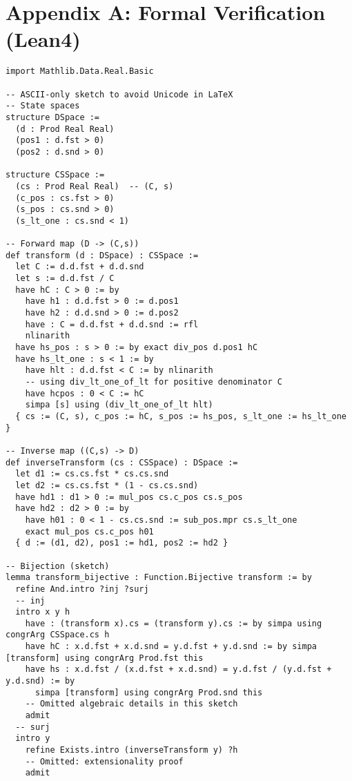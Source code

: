 ﻿\documentclass[11pt,letterpaper,oneside]{article}
\numberwithin{equation}{section}
\newcommand{\1}{\mathbf{1}}
\begin{document}
\section{Appendix A: Formal Verification (Lean4)}\label{app:lean_verification}
\begin{leanproof}
\begin{lstlisting}[basicstyle=\ttfamily\small]
import Mathlib.Data.Real.Basic

-- ASCII-only sketch to avoid Unicode in LaTeX
-- State spaces
structure DSpace :=
  (d : Prod Real Real)
  (pos1 : d.fst > 0)
  (pos2 : d.snd > 0)

structure CSSpace :=
  (cs : Prod Real Real)  -- (C, s)
  (c_pos : cs.fst > 0)
  (s_pos : cs.snd > 0)
  (s_lt_one : cs.snd < 1)

-- Forward map (D -> (C,s))
def transform (d : DSpace) : CSSpace :=
  let C := d.d.fst + d.d.snd
  let s := d.d.fst / C
  have hC : C > 0 := by
    have h1 : d.d.fst > 0 := d.pos1
    have h2 : d.d.snd > 0 := d.pos2
    have : C = d.d.fst + d.d.snd := rfl
    nlinarith
  have hs_pos : s > 0 := by exact div_pos d.pos1 hC
  have hs_lt_one : s < 1 := by
    have hlt : d.d.fst < C := by nlinarith
    -- using div_lt_one_of_lt for positive denominator C
    have hcpos : 0 < C := hC
    simpa [s] using (div_lt_one_of_lt hlt)
  { cs := (C, s), c_pos := hC, s_pos := hs_pos, s_lt_one := hs_lt_one }

-- Inverse map ((C,s) -> D)
def inverseTransform (cs : CSSpace) : DSpace :=
  let d1 := cs.cs.fst * cs.cs.snd
  let d2 := cs.cs.fst * (1 - cs.cs.snd)
  have hd1 : d1 > 0 := mul_pos cs.c_pos cs.s_pos
  have hd2 : d2 > 0 := by
    have h01 : 0 < 1 - cs.cs.snd := sub_pos.mpr cs.s_lt_one
    exact mul_pos cs.c_pos h01
  { d := (d1, d2), pos1 := hd1, pos2 := hd2 }

-- Bijection (sketch)
lemma transform_bijective : Function.Bijective transform := by
  refine And.intro ?inj ?surj
  -- inj
  intro x y h
    have : (transform x).cs = (transform y).cs := by simpa using congrArg CSSpace.cs h
    have hC : x.d.fst + x.d.snd = y.d.fst + y.d.snd := by simpa [transform] using congrArg Prod.fst this
    have hs : x.d.fst / (x.d.fst + x.d.snd) = y.d.fst / (y.d.fst + y.d.snd) := by
      simpa [transform] using congrArg Prod.snd this
    -- Omitted algebraic details in this sketch
    admit
  -- surj
  intro y
    refine Exists.intro (inverseTransform y) ?h
    -- Omitted: extensionality proof
    admit
\end{lstlisting}
\end{leanproof}
\end{document}
